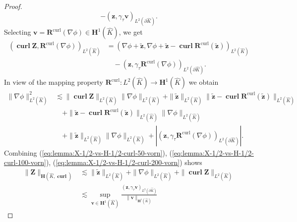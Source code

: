 \documentclass{article}
\begin{document}
\begin{proof}
\[- ({\mathbf z}, \gamma_\tau {\mathbf v})_{L^2(\partial \widehat{K})}. 
\]
Selecting ${\mathbf v} = {\mathbf R}^{\operatorname{curl}}(\nabla \phi) \in {\mathbf H}^1(\widehat{K})$, we get 
\begin{align*}
(\operatorname{\mathbf{curl}} {\mathbf Z},{\mathbf R}^{\operatorname{curl}}(\nabla \phi) )_{L^2(\widehat{K})} &= 
(\nabla \phi + \widetilde {\mathbf z}, \nabla \phi + \widetilde {\mathbf z} - \operatorname{\mathbf{curl}} {\mathbf R}^{\operatorname{curl}}(\widetilde {\mathbf z}))_{L^2(\widehat{K})} \\
&\quad - ({\mathbf z}, \gamma_\tau {\mathbf R}^{\operatorname{curl}}(\nabla \phi))_{L^2(\partial \widehat{K})}.
\end{align*}
In view of the mapping property
${\mathbf R}^{\operatorname{curl}}:L^2(\widehat{K}) \rightarrow {\mathbf H}^1(\widehat{K})$ we obtain 
\begin{align}
\label{eq:lemma:X-1/2-vs-H-1/2-curl-200-vorn}
\|\nabla \phi\|^2_{L^2(\widehat{K})} &\lesssim 
\|\operatorname{\mathbf{curl}} {\mathbf Z}\|_{L^2(\widehat{K})} \|\nabla \phi\|_{L^2(\widehat{K})} + 
\|\widetilde{\mathbf z}\|_{L^2(\widehat K)} 
\|\widetilde{\mathbf z} - \operatorname{\mathbf{curl}} {\mathbf R}^{\operatorname{curl}} (\widetilde{\mathbf z})\|_{L^2(\widehat K)} \\
\nonumber 
& \quad \mbox{} + 
\|\widetilde {\mathbf z} - \operatorname*{\mathbf{curl}} {\mathbf R}^{\operatorname{curl}}(\widetilde {\mathbf z})\|_{L^2(\widehat{K})} \|\nabla \phi\|_{L^2(\widehat{K})} \\
\nonumber 
& \quad \mbox{}+ 
\|\widetilde {\mathbf z} \|_{L^2(\widehat{K})} \|\nabla \phi\|_{L^2(\widehat{K})} + 
\left| ({\mathbf z},\gamma_\tau {\mathbf R}^{\operatorname{curl}}(\nabla \phi))_{L^2(\partial\widehat K)} \right|.
\end{align}
Combining
(\ref{eq:lemma:X-1/2-vs-H-1/2-curl-50-vorn}),
(\ref{eq:lemma:X-1/2-vs-H-1/2-curl-100-vorn}),
(\ref{eq:lemma:X-1/2-vs-H-1/2-curl-200-vorn}) shows 
\begin{align}
\label{eq:lemma:X-1/2-vs-H-1/2-curl-500-vorn}
\|{\mathbf Z}\|_{\mathbf{H}(\widehat{K},\operatorname{\mathbf{curl}})} 
&\lesssim \|\widetilde {\mathbf z}\|_{L^2(\widehat K)} + 
\|\nabla \phi\|_{L^2(\widehat K)} + \|\operatorname{\mathbf{curl}}{\mathbf Z}\|_{L^2(\widehat K)} \\
\nonumber 
& \lesssim \sup_{{\mathbf v} \in {\mathbf H}^1(\widehat K)} 
  \frac{ ({\mathbf z},\gamma_\tau {\mathbf v})_{L^2(\partial \widehat K)}}
       {\|{\mathbf v}\|_{{\mathbf H}^1(\widehat K)}} 

\end{align}
\end{proof}
\end{document}
